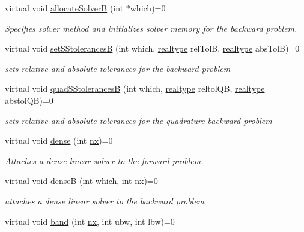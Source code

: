 \begin{DoxyCompactItemize}
virtual void \mbox{\hyperlink{classamici_1_1_solver_adb86fe4b29dd9c370bccee609b8deba3}{allocate\+SolverB}} (int $\ast$which)=0
\begin{DoxyCompactList}\small\item\em Specifies solver method and initializes solver memory for the backward problem. \end{DoxyCompactList}\item 
virtual void \mbox{\hyperlink{classamici_1_1_solver_abc7770e462f49fb8de643ab46ab94985}{set\+S\+StolerancesB}} (int which, \mbox{\hyperlink{namespaceamici_a1bdce28051d6a53868f7ccbf5f2c14a3}{realtype}} rel\+TolB, \mbox{\hyperlink{namespaceamici_a1bdce28051d6a53868f7ccbf5f2c14a3}{realtype}} abs\+TolB)=0
\begin{DoxyCompactList}\small\item\em sets relative and absolute tolerances for the backward problem \end{DoxyCompactList}\item 
virtual void \mbox{\hyperlink{classamici_1_1_solver_afe71105db4de90ce12a37309b252101e}{quad\+S\+StolerancesB}} (int which, \mbox{\hyperlink{namespaceamici_a1bdce28051d6a53868f7ccbf5f2c14a3}{realtype}} reltol\+QB, \mbox{\hyperlink{namespaceamici_a1bdce28051d6a53868f7ccbf5f2c14a3}{realtype}} abstol\+QB)=0
\begin{DoxyCompactList}\small\item\em sets relative and absolute tolerances for the quadrature backward problem \end{DoxyCompactList}\item 
virtual void \mbox{\hyperlink{classamici_1_1_solver_ae98355a8a81e3b54c362413e0de2adbc}{dense}} (int \mbox{\hyperlink{classamici_1_1_solver_a86a18c4e461de76881b6af72e4feb8d9}{nx}})=0
\begin{DoxyCompactList}\small\item\em Attaches a dense linear solver to the forward problem. \end{DoxyCompactList}\item 
virtual void \mbox{\hyperlink{classamici_1_1_solver_aaa1ecd357b3facae2f2d12784563ad25}{denseB}} (int which, int \mbox{\hyperlink{classamici_1_1_solver_a86a18c4e461de76881b6af72e4feb8d9}{nx}})=0
\begin{DoxyCompactList}\small\item\em attaches a dense linear solver to the backward problem \end{DoxyCompactList}\item 
virtual void \mbox{\hyperlink{classamici_1_1_solver_a00863fd76b453dae4e883a6dd5512df3}{band}} (int \mbox{\hyperlink{classamici_1_1_solver_a86a18c4e461de76881b6af72e4feb8d9}{nx}}, int ubw, int lbw)=0

\end{DoxyCompactItemize}
